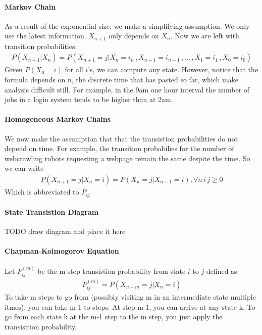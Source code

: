 \paragraph{Markov Chain} As a result of the exponential size, we make a
simplifying assumption. We only use the latest information. $X_{n+1}$ only
depends on $X_n$. Now we are left with transition probabilities:
\begin{equation*} \begin{split}
	P(X_{n+1} | X_n) = P(X_{n+1} = j | X_n = i_n\, , X_{n-1} = i_{n-1}\, , ... \, , X_1 = i_1\, ,X_0 = i_0)
\end{split} \end{equation*}
Given $P(X_0 = i)$ for all $i$'s, we can compute any state. However, notice that
the formula depends on n, the discrete time that has pasted so far, which make
analysis difficult still. For example, in the 9am one hour interval the number
of jobs in a login system tends to be higher than at 2am.

\paragraph{Homogeneous Markov Chains} We now make the assumption that that the
transistion probabilities do not depend on time. For example, the transition
probabilies for the number of webcrawling robots requesting a webpage remain the
same despite the time. So we can write
\begin{equation*} \begin{split}
	P(X_{n+1} = j | X_n = i ) = P(X_{n} =j | X_{n-1} = i ), \forall n\,i\,j \ge 0
\end{split} \end{equation*}
Which is abbreviated to $P_{ij}$


\paragraph{State Transistion Diagram}
TODO draw diagram and place it here

\paragraph{Chapman-Kolmogorov Equation}  \label{chap-komo-eq-explain}
Let $P_{ij}^{(m)}$ be the m step transistion probability from state $i$ to $j$
defined as:
\begin{equation*} \begin{split}
	P_{ij}^{(m)} = P(X_{n+m} = j | X_n = i)
\end{split} \end{equation*}
To take m steps to go from (possibly visiting m in an intermediate state
multiple itmes), you can take m-1 to steps. At step m-1, you can arrive at any
state k. To go from each state k at the m-1 step to the m step, you just apply
the transisition probability.

